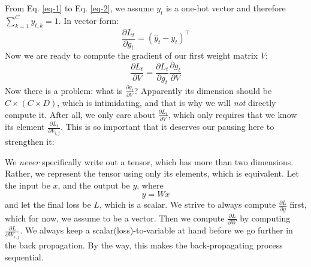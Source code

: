 \documentclass{article}
\begin{document}
From Eq. \eqref{eq-1} to Eq. \eqref{eq-2}, we assume $y_t$ is a one-hot vector and therefore $\sum_{k=1}^Cy_{t, k} = 1$. In vector form:
\begin{equation}
\frac{\partial L_t}{\partial g_t} = (\hat{y}_t - y_t)^\top    
\end{equation}
Now we are ready to compute the gradient of our first weight matrix $V$:
\begin{equation}
    \frac{\partial L_t}{\partial V} = \frac{\partial L_t}{\partial g_t} \frac{\partial g_t}{\partial V}
\end{equation}
Now there is a problem: what is $\frac{\partial g_t}{\partial V}$? Apparently its dimension should be $C\times (C\times D)$, which is intimidating, and that is why we will \emph{not} directly compute it. After all, we only care about $\frac{\partial L_t}{\partial V}$, which only requires that we know its element $\frac{\partial L_t}{\partial V_{i, j}}$. This is so important that it deserves our pausing here to strengthen it:

We \emph{never} specifically write out a tensor, which has more than two dimensions. Rather, we represent the tensor using only its elements, which is equivalent. Let the input be $x$, and the output be $y$, where
\begin{equation}
    y = Wx
\end{equation}
and let the final loss be $L$, which is a scalar. We strive to always compute $\frac{\partial L}{\partial y}$ first, which for now, we assume to be a vector. Then we compute $\frac{\partial L}{\partial W}$ by computing $\frac{\partial L}{\partial W_{i, j}}$. We always keep a scalar(loss)-to-variable at hand before we go further in the back propagation. By the way, this makes the back-propagating process sequential. 
\end{document}
